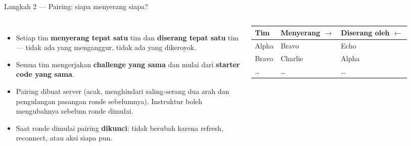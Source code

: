 \documentclass[aspectratio=169,10pt]{beamer}
\newcommand{\hl}[1]{\textcolor{cyanx}{\textbf{#1}}}
\newcommand{\warn}[1]{\textcolor{redx}{\textbf{#1}}}
\begin{document}
\begin{frame}{Langkah 2 --- Pairing: siapa menyerang siapa?}
\begin{columns}[c,onlytextwidth]
\centering
{}
\begin{itemize}\setlength\itemsep{0.35em}
  \item Setiap tim \textbf{menyerang tepat satu} tim dan \textbf{diserang tepat satu} tim --- tidak ada yang menganggur, tidak ada yang dikeroyok.
  \item Semua tim mengerjakan \hl{challenge yang sama} dan mulai dari \hl{starter code yang sama}.
  \item Pairing dibuat server (acak, menghindari saling-serang dua arah dan pengulangan pasangan ronde sebelumnya). Instruktur boleh mengubahnya sebelum ronde dimulai.
  \item Saat ronde dimulai pairing \warn{dikunci}: tidak berubah karena refresh, reconnect, atau aksi siapa pun.
\end{itemize}
\vspace{0.3em}
{\footnotesize
\begin{tabular}{@{}lll@{}}\toprule
Tim & Menyerang $\rightarrow$ & Diserang oleh $\leftarrow$\\\midrule
Alpha & Bravo & Echo\\ Bravo & Charlie & Alpha\\ \dots & \dots & \dots\\\bottomrule
\end{tabular}}
\end{columns}
\end{frame}
\end{document}
